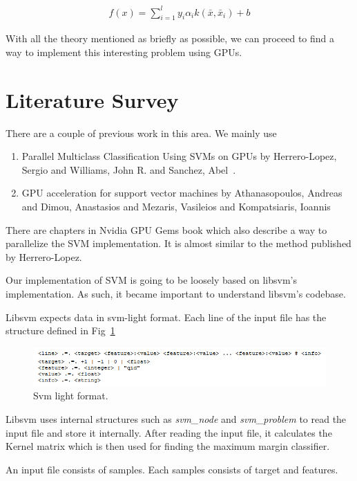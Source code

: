 \documentclass{article}
\begin{document}
\begin{align}
    f(x) = \sum_{i=1}^{l} y_{i}\alpha_{i}k(\bar{x}, \bar{x}_{i}) + b
\end{align}

With all the theory mentioned as briefly as possible, we can proceed to find a way to implement this interesting problem using GPUs.

\section{Literature Survey}
There are a couple of previous work in this area.  We mainly use
\begin{enumerate}
    \item Parallel Multiclass Classification Using SVMs on GPUs by Herrero-Lopez, Sergio and Williams, John R. and Sanchez, Abel~\cite{Herrero-Lopez:2010:PMC:1735688.1735692}.
    \item GPU acceleration for support vector machines by Athanasopoulos, Andreas and Dimou, Anastasios and Mezaris, Vasileios and Kompatsiaris, Ioannis~\cite{athanasopoulos2011gpu}
\end{enumerate}

There are chapters in Nvidia GPU Gems book which also describe a way to parallelize the SVM implementation.  It is almost similar to the method published by Herrero-Lopez.

Our implementation of SVM is going to be loosely based on libsvm's implementation.  As such, it became important to understand libsvm's codebase.

Libsvm expects data in svm-light format.  Each line of the input file has the structure defined in Fig~\ref{fig:svmlight}

\begin{figure}[ht!]
  \centering
  \includegraphics[width=1\textwidth]{images/svmlight}
  \caption{Svm light format.\label{fig:svmlight}}
\end{figure}

Libsvm uses internal structures such as \textit{svm\_node} and \textit{svm\_problem} to read the input file and store it internally.
After reading the input file, it calculates the Kernel matrix which is then used for finding the maximum margin classifier.

An input file consists of samples.  
Each samples consists of target and features.
\end{document}
